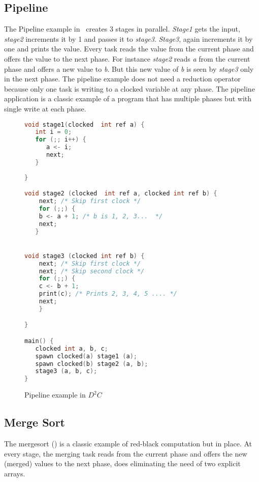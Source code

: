 \documentclass[10pt, conference, compsocconf]{IEEEtran}
\begin{document}
\subsection{Pipeline}
The Pipeline example in~
 creates 3 stages in parallel. \emph{Stage1} gets the input,
\emph{stage2} increments it by 1 and passes it to \emph{stage3}. 
\emph{Stage3}, again increments it by one and prints the value. Every task reads the value
from the current phase and offers the value to the next phase. 
For instance \emph{stage2} reads \emph{a} from the current phase 
and offers a new value to \emph{b}. But this new value of \emph{b} is seen by \emph{stage3} only 
in the next phase. The pipeline example does not need a reduction operator
because only one task is writing to a clocked variable at any phase. The pipeline application is a classic example
 of a program that has multiple phases but with single write at each phase.


\begin{figure}[htbp]
\begin{lstlisting}[language=C]
void stage1(clocked  int ref a) {
   int i = 0;
   for (;; i++) {
      a <- i;
      next;
   }
      
}

void stage2 (clocked  int ref a, clocked int ref b) {
    next; /* Skip first clock */
    for (;;) {
	b <- a + 1; /* b is 1, 2, 3...  */ 
	next;
   }


void stage3 (clocked int ref b) {
    next; /* Skip first clock */
    next; /* Skip second clock */
    for (;;) {
	c <- b + 1;
 	print(c); /* Prints 2, 3, 4, 5 .... */
	next; 
    }

}

main() {
   clocked int a, b, c; 
   spawn clocked(a) stage1 (a);
   spawn clocked(b) stage2 (a, b);
   stage3 (a, b, c);
}
\end{lstlisting}
\caption{Pipeline example in $D^2C$}
\label{fig:pipeline}
\end{figure}


\subsection{Merge Sort}
\label{sec:mergesort}

The mergesort () is a classic example of red-black computation
but in place.
At every stage, the merging task reads from the current phase
and offers the new (merged) values to the next phase, does
eliminating the need of two explicit arrays.
\end{document}
